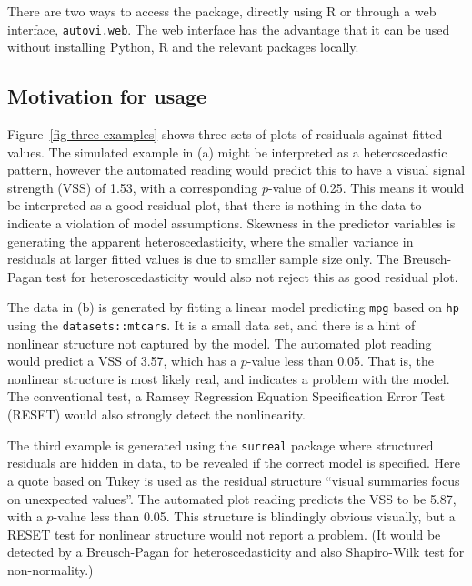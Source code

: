 \documentclass[
doublespace,
  times]{anzsauth}
\begin{document}
There are two ways to access the package, directly using R or through a
web interface, \texttt{autovi.web}. The web interface has the advantage
that it can be used without installing Python, R and the relevant
packages locally.

\subsection{Motivation for usage}\label{sec-why}

Figure~\ref{fig-three-examples} shows three sets of plots of residuals
against fitted values. The simulated example in (a) might be interpreted
as a heteroscedastic pattern, however the automated reading would
predict this to have a visual signal strength (VSS) of 1.53, with a
corresponding \(p\)-value of 0.25. This means it would be interpreted as
a good residual plot, that there is nothing in the data to indicate a
violation of model assumptions. Skewness in the predictor variables is
generating the apparent heteroscedasticity, where the smaller variance
in residuals at larger fitted values is due to smaller sample size only.
The Breusch-Pagan test \citep{breusch1979simple} for heteroscedasticity
would also not reject this as good residual plot.

The data in (b) is generated by fitting a linear model predicting
\texttt{mpg} based on \texttt{hp} using the \texttt{datasets::mtcars}.
It is a small data set, and there is a hint of nonlinear structure not
captured by the model. The automated plot reading would predict a VSS of
3.57, which has a \(p\)-value less than 0.05. That is, the nonlinear
structure is most likely real, and indicates a problem with the model.
The conventional test, a Ramsey Regression Equation Specification Error
Test (RESET) \citep{ramsey1969tests} would also strongly detect the
nonlinearity.

The third example is generated using the \texttt{surreal} package
\citep{surreal} where structured residuals are hidden in data, to be
revealed if the correct model is specified. Here a quote based on Tukey
is used as the residual structure ``visual summaries focus on unexpected
values''. The automated plot reading predicts the VSS to be 5.87, with a
\(p\)-value less than 0.05. This structure is blindingly obvious
visually, but a RESET test for nonlinear structure would not report a
problem. (It would be detected by a Breusch-Pagan for heteroscedasticity
and also Shapiro-Wilk test \citep{shapiro1965analysis} for
non-normality.)
\end{document}
